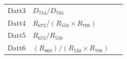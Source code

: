 \documentclass[remotesensing,article,accept,moreauthors,pdftex]{Definitions/mdpi}
\begin{document}
\begin{paracol}{2}
\begin{specialtable}[H]
{\begin{tabular}{lll}
		Datt3           & $D_{754}/D_{704}$                                                                                    &~\cite{datt1999}               \\
		Datt4           & $R_{672}/(R_{550} \times R_{708})$                                                                   &~\cite{datt1998}               \\
		Datt5           & $R_{672}/R_{550}$                                                                                    &~\cite{datt1998}               \\
		Datt6           & $(R_{860})/(R_{550}\times R_{708})$                                                                  &~\cite{datt1998}               \\

\end{tabular}}
\end{specialtable}
\end{paracol}
\end{document}
